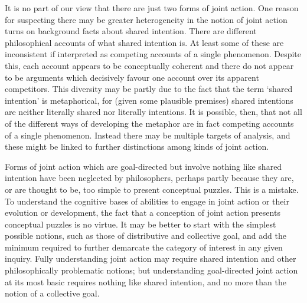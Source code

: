 \documentclass[12pt,a4paper]{extarticle}
\begin{document}
It is no part of our view that there are just two forms of joint action.  
One reason for suspecting there may be greater heterogeneity in the notion of joint action turns on background facts about shared intention.
There are different philosophical accounts of what shared intention is.  
At least some of these are inconsistent if interpreted as competing accounts of a single phenomenon.
Despite this, each account appears to be conceptually coherent and there  do not appear to be arguments which decisively favour one account over its apparent competitors.
This diversity may be partly due to the fact that the term `shared intention' is metaphorical, for (given some plausible premises) shared intentions are neither literally shared nor literally intentions.  
It is possible, then, that not all of the different ways of developing the metaphor are in fact competing accounts of a single phenomenon.
Instead there may be multiple targets of analysis, and these might be linked to further distinctions among kinds of joint action.

Forms of joint action which are goal-directed but involve nothing like shared intention have been neglected by philosophers, perhaps 
partly because they are, or are thought to be, too simple to present conceptual puzzles.
This is a mistake.  
To understand the cognitive bases of abilities to engage in joint action or their evolution or development, the fact that a conception of joint action presents conceptual puzzles is no virtue.
It may be better to start with the simplest possible notions, such as those of distributive and collective goal, and add the minimum required to further demarcate the category of interest in any given inquiry.
Fully understanding joint action may require shared intention and other philosophically problematic notions; but
understanding goal-directed joint action at its most basic requires nothing like shared intention, and no more than the notion of a collective goal.


\end{document}
